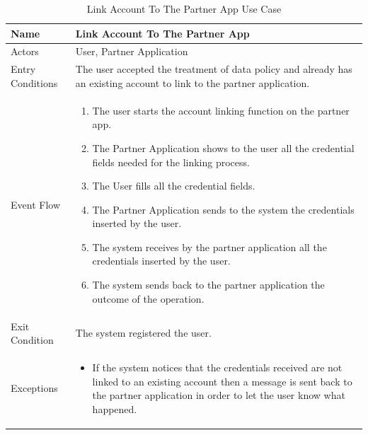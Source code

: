 \begin{enumerate}
\FloatBarrier
\begin{table}[h]
\begin{tabular}{|p{3.4cm}|p{}|}
\hline
Name             & Link Account To The Partner App\\ \hline
Actors           & User, Partner Application  \\ \hline
Entry Conditions & The user accepted the treatment of data policy and already has an existing account to link to the partner application.  \\ \hline
Event Flow       & \begin{enumerate}
			\item The user starts the account linking function on the partner app.
			\item The Partner Application shows to the user all the credential fields needed for the linking process.
            \item The User fills all the credential fields.
            \item The Partner Application sends to the system the credentials inserted by the user.
            \item The system receives by the partner application all the credentials inserted by the user.
            \item The system sends back to the partner application the outcome of the operation. 
        \end{enumerate}\\ \hline
Exit Condition   & The system registered the user.\\ \hline
Exceptions       & \begin{itemize}
\item If the system notices that the credentials received are not linked to an existing account then a message is sent back to the partner application in order to let the user know what happened.
\end{itemize}\\ \hline
\end{tabular}
\caption{Link Account To The Partner App Use Case}
\end{table}
\FloatBarrier



\end{enumerate}
